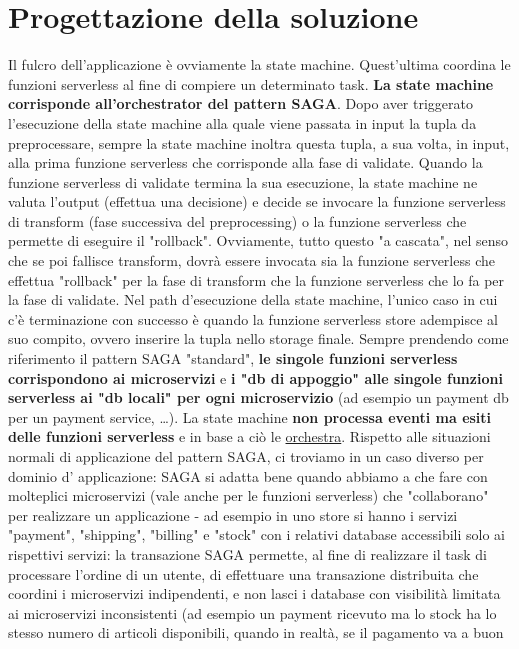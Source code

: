 \documentclass[
    sigconf, 
    screen=false, 
    acmthm=false, 
    nonacm
]{acmart}
\begin{document}
\section{Progettazione della soluzione}
Il fulcro dell'applicazione è ovviamente la state machine. Quest'ultima coordina le funzioni serverless al fine di
compiere un determinato task. \textbf{La state machine corrisponde all'orchestrator del pattern SAGA}. Dopo aver triggerato
l'esecuzione della state machine alla quale viene passata in input la tupla da preprocessare, sempre la state machine
inoltra questa tupla, a sua volta, in input, alla prima funzione serverless che corrisponde alla fase di validate. Quando la funzione serverless di validate
termina la sua esecuzione, la state machine ne valuta l'output (effettua una decisione) e decide se invocare la 
funzione serverless di transform (fase successiva del preprocessing) o la
funzione serverless che permette di eseguire il "rollback". Ovviamente, tutto questo "a cascata", nel senso che se poi fallisce
transform, dovrà essere invocata sia la funzione serverless che effettua "rollback" per la fase di transform che la funzione serverless che 
lo fa per la fase di validate. Nel path d'esecuzione della state machine, l'unico caso in cui c'è terminazione con successo
è quando la funzione serverless store adempisce al suo compito, ovvero inserire la tupla nello storage finale. Sempre prendendo come
riferimento il pattern SAGA "standard", \textbf{le singole funzioni serverless corrispondono ai microservizi} e \textbf{i "db di
appoggio" alle singole funzioni serverless ai "db locali" per ogni microservizio} (ad esempio un payment db per un payment service, \dots).
La state machine \textbf{non processa eventi ma esiti delle funzioni serverless} e in base a ciò le \underline{orchestra}.
Rispetto alle situazioni normali di applicazione del pattern SAGA, ci troviamo in un caso diverso per dominio d'
applicazione: SAGA si adatta bene quando abbiamo a che fare con molteplici microservizi (vale anche per le funzioni 
serverless) che "collaborano" per
realizzare un applicazione - ad esempio in uno store si hanno i servizi "payment", "shipping", "billing" e "stock" 
con i relativi database accessibili solo ai rispettivi servizi: la transazione SAGA permette, al fine di realizzare 
il task di processare l'ordine di un utente, di effettuare una transazione distribuita che coordini i
microservizi indipendenti, e non lasci i database con visibilità limitata ai microservizi inconsistenti (ad esempio 
un payment ricevuto ma lo stock ha lo stesso numero di articoli disponibili, quando in realtà, se il pagamento va a buon 
\end{document}
